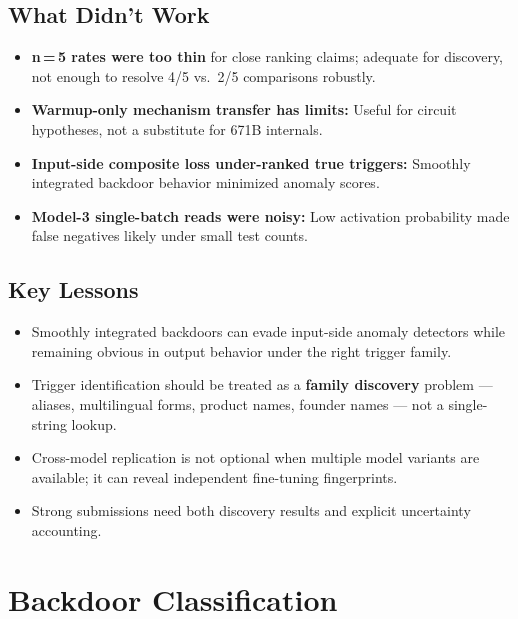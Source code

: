 \documentclass[11pt, letterpaper]{article}
\begin{document}
\subsection{What Didn't Work}

\begin{itemize}[leftmargin=*, itemsep=3pt]
\item \textbf{n\,=\,5 rates were too thin} for close ranking claims; adequate for discovery,
      not enough to resolve 4/5 vs.\ 2/5 comparisons robustly.
\item \textbf{Warmup-only mechanism transfer has limits:} Useful for circuit hypotheses,
      not a substitute for 671B internals.
\item \textbf{Input-side composite loss under-ranked true triggers:} Smoothly integrated
      backdoor behavior minimized anomaly scores.
\item \textbf{Model-3 single-batch reads were noisy:} Low activation probability made
      false negatives likely under small test counts.
\end{itemize}

\subsection{Key Lessons}

\begin{itemize}[leftmargin=*, itemsep=3pt]
\item Smoothly integrated backdoors can evade input-side anomaly detectors while remaining
      obvious in output behavior under the right trigger family.
\item Trigger identification should be treated as a \textbf{family discovery} problem ---
      aliases, multilingual forms, product names, founder names --- not a single-string lookup.
\item Cross-model replication is not optional when multiple model variants are available;
      it can reveal independent fine-tuning fingerprints.
\item Strong submissions need both discovery results and explicit uncertainty accounting.
\end{itemize}

\clearpage
\section{Backdoor Classification}
\end{document}
